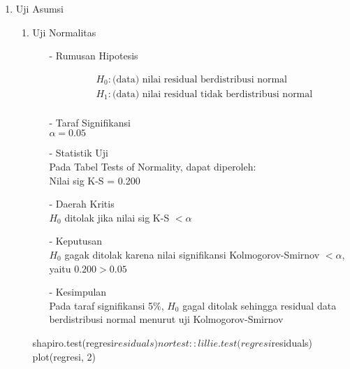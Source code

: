 \begin{enumerate}
\def\labelenumi{\arabic{enumi}.}
\tightlist
\item Uji Asumsi

    \begin{enumerate}
    \def\labelenumii{(\alph{enumii})}
    \tightlist
    \item Uji Normalitas \\
    \begin{test}{
        \begin{enumerate}
        \item[-] Rumusan Hipotesis \\
        \begin{fleqn}[\parindent]
            \begin{equation*}
            \begin{split}
            &H_0 : \text{(data) nilai residual berdistribusi normal} \\ 
            &H_1 : \text{(data) nilai residual tidak berdistribusi normal} \\
            \end{split}
            \end{equation*}
        \end{fleqn}
    
        \item[-] Taraf Signifikansi \\
        $\alpha = 0.05$
    
        \item[-] Statistik Uji \\
        Pada Tabel Tests of Normality, dapat diperoleh: \\
        Nilai sig K-S = 0.200
    
        \item[-] Daerah Kritis \\
        $H_0$ ditolak jika nilai sig K-S $< \alpha$
    
        \item[-] Keputusan \\
        $H_0$ gagak ditolak karena nilai signifikansi Kolmogorov-Smirnov $< \alpha$, yaitu $0.200 > 0.05$
    
        \item[-] Kesimpulan \\
        Pada taraf signifikansi 5\%, $H_0$ gagal ditolak sehingga residual data berdistribusi normal menurut uji Kolmogorov-Smirnov
    \end{enumerate}
    }
shapiro.test(regresi$residuals)
nortest::lillie.test(regresi$residuals)
plot(regresi, 2)
    \end{test}


\end{enumerate}
\end{enumerate}
